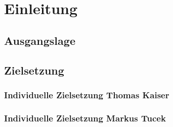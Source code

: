 \chapter{Einleitung}


\section{Ausgangslage}

\section{Zielsetzung}

\subsection{Individuelle Zielsetzung Thomas Kaiser}

\subsection{Individuelle Zielsetzung Markus Tucek}